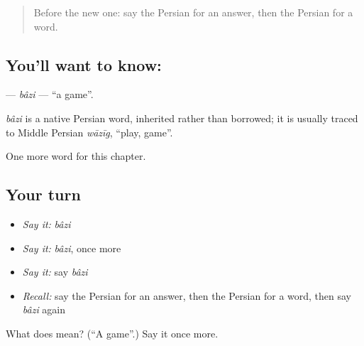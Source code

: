 \begin{quote}
Before the new one: say the Persian for an answer, then the Persian for a word.
\end{quote}

\subsection*{You'll want to know: }
\textbf{} — \emph{bâzi} — \textquotedblleft{}a game\textquotedblright{}.

\begin{cousinweb}
\emph{bâzi} is a native Persian word, inherited rather than borrowed; it is usually traced to Middle Persian \emph{wāzīg}, \textquotedblleft{}play, game\textquotedblright{}.
\end{cousinweb}

\begin{grammarlens}[title={What you've built}]
One more word for this chapter.
\end{grammarlens}

\subsection*{Your turn}
\begin{itemize}
\raggedright
  \item \emph{Say it:} \emph{bâzi}
  \item \emph{Say it:} \emph{bâzi}, once more
  \item \emph{Say it:} say \emph{bâzi}
  \item \emph{Recall:} say the Persian for an answer, then the Persian for a word, then say \emph{bâzi} again
\end{itemize}

\begin{tcolorbox}[breakable,colback=teal!4,colframe=teal!35!black,title={Before you move on}]
What does  mean? (\textquotedblleft{}A game\textquotedblright{}.) Say it once more.
\end{tcolorbox}
